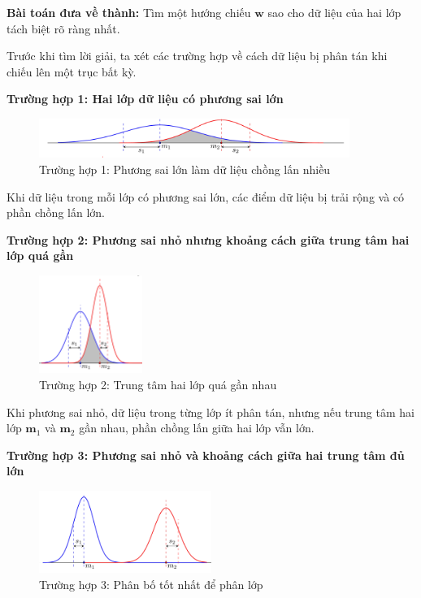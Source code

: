 \textbf{Bài toán đưa về thành:} Tìm một hướng chiếu \( \mathbf{w} \) sao cho dữ liệu của hai lớp tách biệt rõ ràng nhất.

Trước khi tìm lời giải, ta xét các trường hợp về cách dữ liệu bị phân tán khi chiếu lên một trục bất kỳ.  

\hspace{1cm}\textbf{Trường hợp 1: Hai lớp dữ liệu có phương sai lớn}  

\begin{figure}[htbp]
    \centering
    \includegraphics[width=0.9\textwidth]{assets/2_1_1a.png}
    \caption{Trường hợp 1: Phương sai lớn làm dữ liệu chồng lấn nhiều}
    \label{fig:case1}
\end{figure}

\hspace{1cm}Khi dữ liệu trong mỗi lớp có phương sai lớn, các điểm dữ liệu bị trải rộng và có phần chồng lấn lớn.  

\hspace{1cm}\textbf{Trường hợp 2: Phương sai nhỏ nhưng khoảng cách giữa trung tâm hai lớp quá gần}  

\begin{figure}[htbp]
    \centering
    \includegraphics[width=0.3\textwidth]{assets/2_1_1b.png}
    \caption{Trường hợp 2: Trung tâm hai lớp quá gần nhau}
    \label{fig:case2}
\end{figure}

\hspace{1cm}Khi phương sai nhỏ, dữ liệu trong từng lớp ít phân tán, nhưng nếu trung tâm hai lớp \( \mathbf{m}_1 \) và \( \mathbf{m}_2 \) gần nhau, phần chồng lấn giữa hai lớp vẫn lớn.  

\hspace{1cm}\textbf{Trường hợp 3: Phương sai nhỏ và khoảng cách giữa hai trung tâm đủ lớn}  

\begin{figure}[htbp]
    \centering
    \includegraphics[width=0.5\textwidth]{assets/2_1_1c.png}
    \caption{Trường hợp 3: Phân bố tốt nhất để phân lớp}
    \label{fig:case3}
\end{figure}

